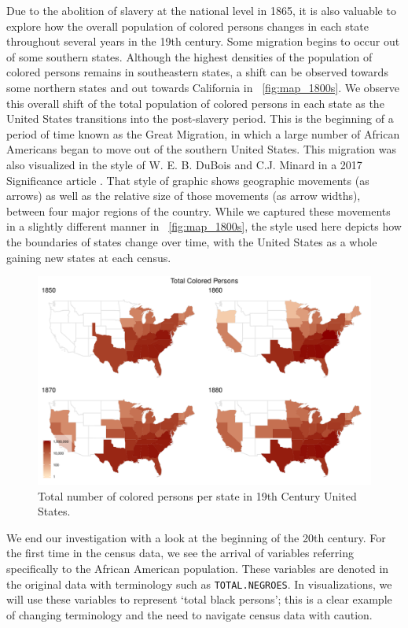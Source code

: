 \documentclass[DIV=calc, paper=a4, fontsize=10pt, twocolumn]{scrartcl}\usepackage[]{graphicx}\usepackage[]{color}
\newenvironment{knitrout}{}{} %
\begin{document}
\par Due to the abolition of slavery at the national level in 1865, it is also valuable to explore how the overall population of colored persons changes in each state throughout several years in the 19th century. Some migration begins to occur out of some southern states. Although the highest densities of the population of colored persons remains in southeastern states, a shift can be observed towards some northern states and out towards California in ~\autoref{fig:map_1800s}. We observe this overall shift of the total population of colored persons in each state as the United States transitions into the post-slavery period. This is the beginning of a period of time known as the Great Migration, in which a large number of African Americans began to move out of the southern United States. This migration was also visualized in the style of W. E. B. DuBois and C.J. Minard in a 2017 Significance article \citep{great-migration}. That style of graphic shows geographic movements (as arrows) as well as the relative size of those movements (as arrow widths), between four major regions of the country. While we captured these movements in a slightly different manner in ~\autoref{fig:map_1800s}, the style used here depicts how the boundaries of states change over time, with the United States as a whole gaining new states at each census.  

\begin{knitrout}
\color{fgcolor}\begin{figure}[h]
\includegraphics[width=.5\textwidth]{figure/map_1800s-1} \caption[Total number of colored persons per state in 19th Century United States]{Total number of colored persons per state in 19th Century United States.}\label{fig:map_1800s}
\end{figure}


\end{knitrout}

\par We end our investigation with a look at the beginning of the 20th century. For the first time in the census data, we see the arrival of variables referring specifically to the African American population. These variables are denoted in the original data with terminology such as \texttt{TOTAL.NEGROES}. In visualizations, we will use these variables to represent `total black persons'; this is a clear example of changing terminology and the need to navigate census data with caution. 
\end{document}
